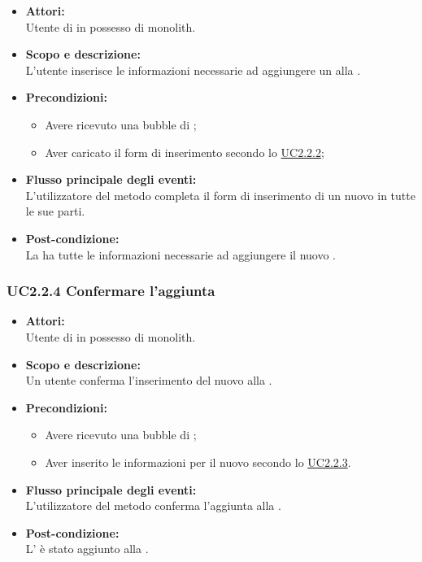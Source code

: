 \begin{itemize}
	\item \textbf{Attori:}
	\\Utente di  in possesso di monolith.
	\item \textbf{Scopo e descrizione:} 
	\\L’utente inserisce le informazioni necessarie ad aggiungere un  alla .
	\item \textbf{Precondizioni:}
	\begin{itemize}
		\item Avere ricevuto una bubble di ;
		\item Aver caricato il form di inserimento secondo lo \hyperref[UC2.2.2]{UC2.2.2};
	\end{itemize}
	\item \textbf{Flusso principale degli eventi:}
	\\L’utilizzatore del metodo completa il form di inserimento di un nuovo  in tutte le sue parti.
	\item \textbf{Post-condizione:}
	\\La {} ha tutte le informazioni necessarie ad aggiungere il nuovo .
\end{itemize}

\subsubsection{UC2.2.4 Confermare l’aggiunta} \label{UC2.2.4}

\begin{itemize}
	\item \textbf{Attori:}
	\\Utente di  in possesso di monolith.
	\item \textbf{Scopo e descrizione:} 
	\\Un utente conferma l’inserimento del nuovo  alla .
	\item \textbf{Precondizioni:}
	\begin{itemize}
		\item Avere ricevuto una bubble di ;
		\item Aver inserito le informazioni per il nuovo  secondo lo \hyperref[UC2.2.3]{UC2.2.3}.
	\end{itemize}
	\item \textbf{Flusso principale degli eventi:}
	\\L’utilizzatore del metodo conferma l’aggiunta alla .
	\item \textbf{Post-condizione:}
	\\L’ è stato aggiunto alla .
\end{itemize}

